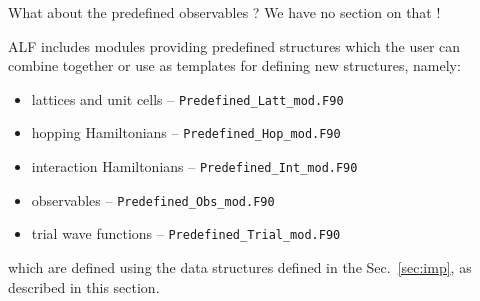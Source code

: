 

{\color{red}    What about the predefined observables ?    We have no section on that ! }

ALF includes modules providing predefined structures which the user can combine together or use as templates for defining new structures, namely: 
\begin{itemize}
	\item lattices and unit cells -- \texttt{Predefined\_Latt\_mod.F90}
	\item hopping Hamiltonians -- \texttt{Predefined\_Hop\_mod.F90 }
	\item interaction Hamiltonians -- \texttt{Predefined\_Int\_mod.F90}
	\item observables -- \texttt{Predefined\_Obs\_mod.F90 }
	\item trial wave functions -- \texttt{Predefined\_Trial\_mod.F90 }
\end{itemize}
which are defined using the data structures defined in the Sec.~\ref{sec:imp}, as described in this section.












